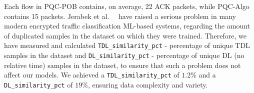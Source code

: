 \documentclass[10pt,journal]{IEEEtran}%
\begin{document}

Each flow in PQC-POB contains, on average, 22 ACK packets, while PQC-Algo contains 15 packets. 
Jerabek et al.\ ~\cite{jerabek2025simplemodeljustworks} have raised a serious problem in many modern encrypted traffic classification ML-based systems, regarding the amount of duplicated samples in the dataset on which they were trained. Therefore, we have measured and calculated \texttt{TDL\_similarity\_pct} - percentage of unique TDL samples in the dataset and \texttt{DL\_similarity\_pct} - percentage of unique DL (no relative time) samples in the dataset, to ensure that such a problem does not affect our models. We achieved a \texttt{TDL\_similarity\_pct} of $1.2\%$ and a \texttt{DL\_similarity\_pct} of $19\%$, ensuring data complexity and variety.
\end{document}
